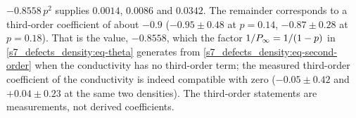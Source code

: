 $-0.8558\,p^{2}$ supplies $0.0014$, $0.0086$ and $0.0342$. The remainder corresponds to a third-order coefficient
of about $-0.9$ ($-0.95\pm0.48$ at $p=0.14$, $-0.87\pm0.28$ at $p=0.18$). That is the value, $-0.8558$, which the
factor $1/P_{\infty}=1/(1-p)$ in \eqref{s7_defects_density:eq-theta} generates from \eqref{s7_defects_density:eq-second-order}
when the conductivity has no third-order term; the measured third-order coefficient of the conductivity is indeed
compatible with zero ($-0.05\pm0.42$ and $+0.04\pm0.23$ at the same two densities). The third-order statements are
measurements, not derived coefficients.

